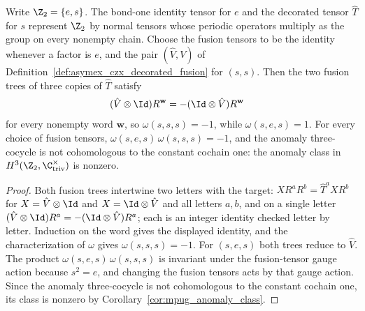 \begin{lemma}
    \label{thm:asymex_czx_decorated_anomaly_class}
    \leanok
    Write $\Z_2=\{e,s\}$. The bond-one identity tensor for $e$ and the
    decorated tensor $\widehat T$ for $s$ represent $\Z_2$ by normal tensors
    whose periodic operators multiply as the group on every nonempty chain.
    Choose the fusion tensors to be the identity whenever a factor is $e$,
    and the pair $(\hat V,V)$ of
    Definition~\ref{def:asymex_czx_decorated_fusion} for $(s,s)$. Then the
    two fusion trees of three copies of $\widehat T$ satisfy
    \begin{align}
        (\hat V\otimes\Id)R^{\mathbf w}
         & =-(\Id\otimes\hat V)R^{\mathbf w}
        \notag
    \end{align}
    for every nonempty word $\mathbf w$, so $\omega(s,s,s)=-1$, while
    $\omega(s,e,s)=1$. For every choice of fusion tensors,
    $\omega(s,e,s)\,\omega(s,s,s)=-1$, and the anomaly three-cocycle is not
    cohomologous to the constant cochain one: the anomaly class in
    $H^3(\Z_2,\C^\times_{\mathrm{triv}})$ is nonzero.
\end{lemma}

\begin{proof}
    \leanok
    Both fusion trees intertwine two letters with the target:
    $X R^{a}R^{b}=\widehat T^{a}XR^{b}$ for $X=\hat V\otimes\Id$ and
    $X=\Id\otimes\hat V$ and all letters $a,b$, and on a single letter
    $(\hat V\otimes\Id)R^{a}=-(\Id\otimes\hat V)R^{a}$; each is an integer
    identity checked letter by letter. Induction on the word gives the
    displayed identity, and the characterization of $\omega$ gives
    $\omega(s,s,s)=-1$. For $(s,e,s)$ both trees reduce to $\hat V$. The
    product $\omega(s,e,s)\,\omega(s,s,s)$ is invariant under the
    fusion-tensor gauge action because $s^2=e$, and changing the fusion
    tensors acts by that gauge action. Since the anomaly three-cocycle is not
    cohomologous to the constant cochain one, its class is nonzero by
    Corollary~\ref{cor:mpug_anomaly_class}.
\end{proof}

